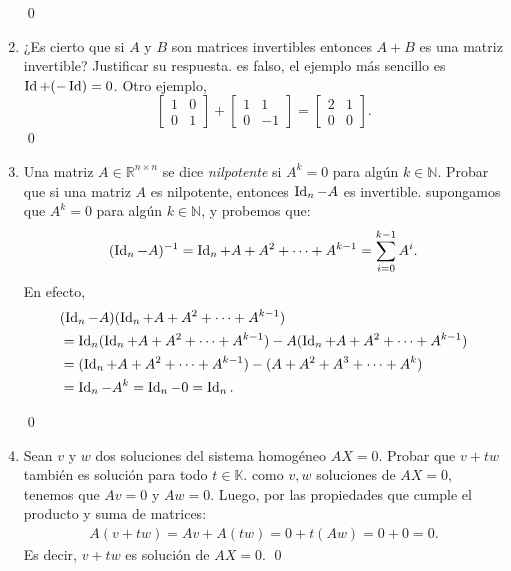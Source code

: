 \begin{enumerate}[topsep=6pt,itemsep=.4cm]
\qed



\item ¿Es cierto que si $A$ y $B$ son matrices invertibles entonces $A+B$ es una matriz invertible? Justificar su respuesta.
\rta es  falso, el ejemplo más sencillo es $\operatorname{Id} +(-\operatorname{Id}) =0$. Otro ejemplo, 
\begin{equation*}
    \begin{bmatrix}  1&0\\0&1 \end{bmatrix} + \begin{bmatrix}  1&1\\0&-1 \end{bmatrix} = \begin{bmatrix}  2&1\\0&0 \end{bmatrix}. 
\end{equation*}\qed



\item\label{nilpotene - id} Una matriz $A\in\mathbb{R}^{n\times n}$ se dice \emph{nilpotente} si $A^k=0$ para algún $k\in\mathbb{N}$.
Probar que si una matriz $A$ es nilpotente, entonces  $\operatorname{Id}_n - A$  es invertible.
\rta supongamos que $A^k=0$ para algún $k\in\mathbb{N}$, y probemos que: $$(\operatorname{Id}_n - A)^{-1} = \operatorname{Id}_n + A + A^2 +\cdots + A^{k-1} = \sum_{i=0}^{k-1} A^{i}.$$
En efecto,
\begin{align*}
& (\operatorname{Id}_n - A)(\operatorname{Id}_n + A + A^2 +\cdots + A^{k-1})\\
&= \operatorname{Id}_n (\operatorname{Id}_n + A + A^2 +\cdots + A^{k-1}) - A (\operatorname{Id}_n + A + A^2 +\cdots + A^{k-1})\\
&= (\operatorname{Id}_n + A + A^2 +\cdots + A^{k-1}) - (A + A^2 + A^3 +\cdots + A^{k})\\
&= \operatorname{Id}_n - A^{k} = \operatorname{Id}_n - 0 = \operatorname{Id}_n.
\end{align*}

\qed


\item\label{sol homog es subesp} Sean  $v$ y $w$ dos soluciones del sistema homogéneo $AX=0$. Probar que $v+tw$ también es solución para todo $t\in\mathbb{K}$.
\rta como $v,w$  soluciones de $AX=0$, tenemos que $Av=0$ y $Aw=0$.  Luego, por las propiedades que cumple el producto y suma de matrices:
\begin{eqnarray*}
    A(v + tw) = Av +A(tw) = 0 + t(Aw) = 0 + 0 = 0.
\end{eqnarray*}
Es decir, $v +tw$  es solución de $AX=0$.
\qed



\end{enumerate}
